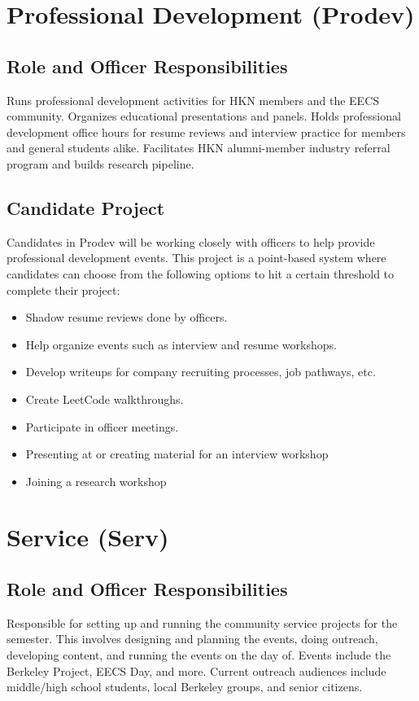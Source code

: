 \documentclass[11pt, article, oneside]{memoir}
\begin{document}
    \section{Professional Development (Prodev)}
    \subsection{Role and Officer Responsibilities}
        Runs professional development activities for HKN members and the EECS community.
        Organizes educational presentations and panels.
        Holds professional development office hours for resume reviews and interview practice for members and general students alike.
        Facilitates HKN alumni-member industry referral program and builds research pipeline.

    \subsection{Candidate Project}
        Candidates in Prodev will be working closely with officers to help provide professional development events.
        This project is a point-based system where candidates can choose from the following options to hit a certain threshold to complete their project:
        \begin{itemize}
            \item Shadow resume reviews done by officers.
            \item Help organize events such as interview and resume workshops.
            \item Develop writeups for company recruiting processes, job pathways, etc.
            \item Create LeetCode walkthroughs.
            \item Participate in officer meetings.
            \item Presenting at or creating material for an interview workshop
            \item Joining a research workshop
        \end{itemize}

    \section{Service (Serv)}
    \subsection{Role and Officer Responsibilities}
        Responsible for setting up and running the community service projects for the semester.
        This involves designing and planning the events, doing outreach, developing content, and running the events on the day of.
        Events include the Berkeley Project, EECS Day, and more.
        Current outreach audiences include middle/high school students, local Berkeley groups, and senior citizens.
\end{document}
